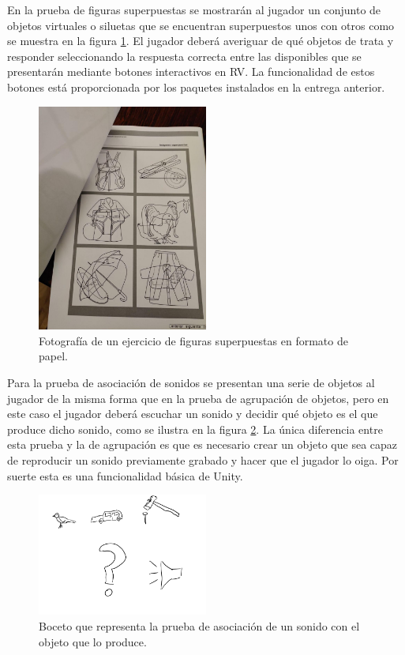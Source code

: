 En la prueba de figuras superpuestas se mostrarán al jugador un conjunto de objetos virtuales o siluetas que se encuentran superpuestos unos con otros como se muestra en la figura \ref{fig:E2_superpuestas}. El jugador deberá averiguar de qué objetos de trata y responder seleccionando la respuesta correcta entre las disponibles que se presentarán mediante botones interactivos en RV. La funcionalidad de estos botones está proporcionada por los paquetes instalados en la entrega anterior.


\begin{figure}
  \centering
    \includegraphics[width=0.5\textwidth]{04.Desarrollo/02.Entrega2/01.Iteracion2_1/00.Figuras/07.superpuestas.jpg}
    \caption{Fotografía de un ejercicio de figuras superpuestas en formato de papel.}
    \label{fig:E2_superpuestas}
\end{figure}

Para la prueba de asociación de sonidos se presentan una serie de objetos al jugador de la misma forma que en la prueba de agrupación de objetos, pero en este caso el jugador deberá escuchar un sonido y decidir qué objeto es el que produce dicho sonido, como se ilustra en la figura \ref{fig:E2_sonidos}. La única diferencia entre esta prueba y la de agrupación es que es necesario crear un objeto que sea capaz de reproducir un sonido previamente grabado y hacer que el jugador lo oiga. Por suerte esta es una funcionalidad básica de Unity.


\begin{figure}
  \centering
    \includegraphics[width=0.5\textwidth]{04.Desarrollo/02.Entrega2/01.Iteracion2_1/00.Figuras/08.sonidos.png}
    \caption{Boceto que representa la prueba de asociación de un sonido con el objeto que lo produce.}
    \label{fig:E2_sonidos}
\end{figure}



